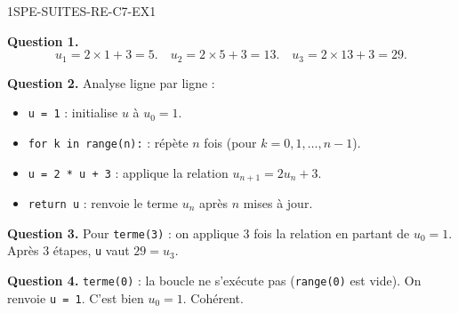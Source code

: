\begin{corrige}{1SPE-SUITES-RE-C7-EX1}


\textbf{Question 1.}
\[
u_1 = 2 \times 1 + 3 = 5. \quad u_2 = 2 \times 5 + 3 = 13. \quad u_3 = 2 \times 13 + 3 = 29.
\]


\textbf{Question 2.} Analyse ligne par ligne :
\begin{itemize}
  \item \texttt{u = 1} : initialise $u$ à $u_0 = 1$.
  \item \texttt{for k in range(n):} : répète $n$ fois (pour $k = 0, 1, \ldots, n-1$).
  \item \texttt{u = 2 * u + 3} : applique la relation $u_{n+1} = 2u_n + 3$.
  \item \texttt{return u} : renvoie le terme $u_n$ après $n$ mises à jour.
\end{itemize}

\textbf{Question 3.} Pour \texttt{terme(3)} : on applique $3$ fois la relation en partant de $u_0 = 1$.
Après $3$ étapes, \texttt{u} vaut $29 = u_3$. \checkmark


\textbf{Question 4.} \texttt{terme(0)} : la boucle ne s'exécute pas (\texttt{range(0)} est vide). On renvoie \texttt{u = 1}. C'est bien $u_0 = 1$. Cohérent. \checkmark

\end{corrige}



